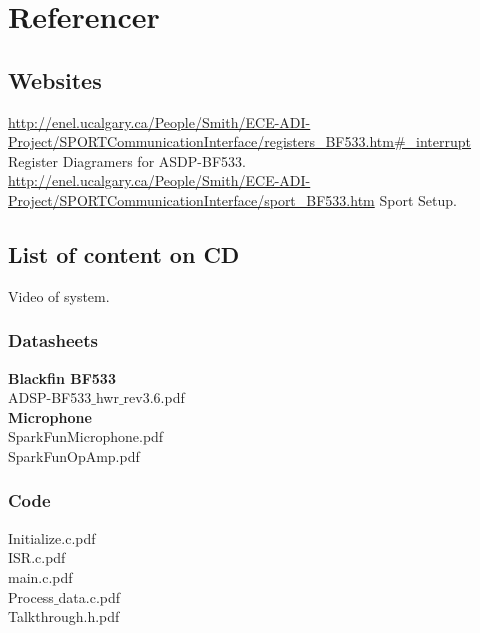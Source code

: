 \chapter{Referencer}
\section{Websites}
\url{http://enel.ucalgary.ca/People/Smith/ECE-ADI-Project/SPORTCommunicationInterface/registers_BF533.htm#_interrupt}
Register Diagramers for ASDP-BF533.\\
\url{http://enel.ucalgary.ca/People/Smith/ECE-ADI-Project/SPORTCommunicationInterface/sport_BF533.htm}
Sport Setup.\\

\section{List of content on CD}
Video of system.

\subsection{Datasheets} 
\textbf{Blackfin BF533}\\
ADSP-BF533$\_$hwr$\_$rev3.6.pdf\\
\textbf{Microphone}\\
SparkFunMicrophone.pdf\\
SparkFunOpAmp.pdf\\


\subsection{Code}
Initialize.c.pdf\\
ISR.c.pdf\\
main.c.pdf\\
Process$\_$data.c.pdf\\
Talkthrough.h.pdf\\